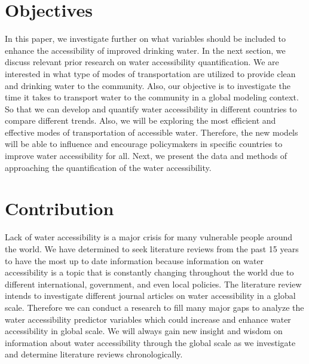 \documentclass[10pt,twoside]{article}
\numberwithin{equation}{section}
\newcommand{\?}{\stackrel{?}{=}}
\newcommand{\rd}{\color{red}}
\begin{document}
\section{Objectives}
In this paper, we investigate further on what
variables should be included to enhance the accessibility of improved drinking water.
In the next section, we discuss relevant prior research on water accessibility quantification. We are interested in what type of modes of
transportation are utilized to provide clean and drinking water to the community. Also, our objective is to investigate
the time it takes to transport water to the community in a global modeling context. So that we can develop and quantify
water accessibility in different countries to compare different trends. Also, we will be exploring the most efficient
and effective modes of transportation of accessible water. Therefore, the new models will be able to influence and
encourage policymakers in specific countries to improve water accessibility for all. Next, we present the data and methods of approaching the quantification of the water accessibility. 
 
\section{Contribution}
Lack of water accessibility is a major crisis for many vulnerable people around the world. We have determined to seek literature reviews from the past 15 years to have the most up to date information because information on water accessibility is a topic that is constantly changing throughout the world due to different international, government, and even local policies. The literature review intends to investigate different journal articles on water accessibility in a global scale. Therefore we can conduct a research to fill many major gaps  to analyze the water accessibility predictor variables which could increase and enhance water accessibility in global scale. We will always gain new insight and wisdom on information about water accessibility through the global scale as we investigate and determine literature reviews chronologically. 
\end{document}
